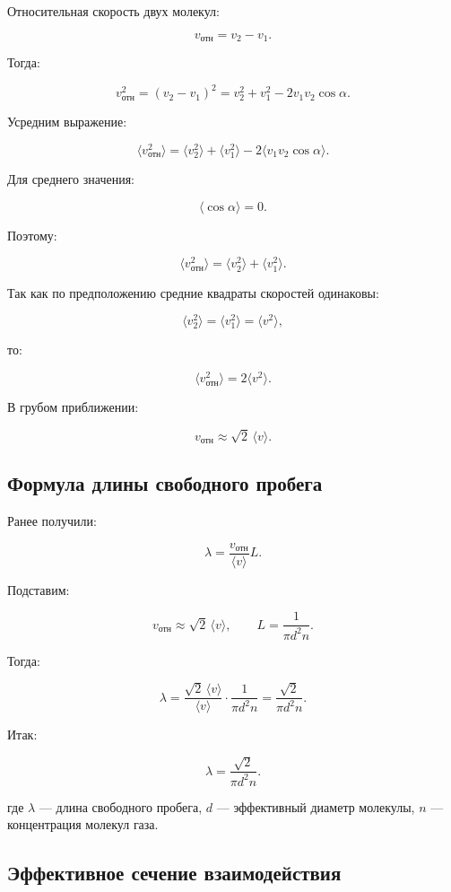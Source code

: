 \documentclass[a4paper,12pt]{article}
\begin{document}
Относительная скорость двух молекул:

\[
v_{\text{отн}}=v_2-v_1.
\]

Тогда:

\[
v_{\text{отн}}^2=(v_2-v_1)^2=v_2^2+v_1^2-2v_1v_2\cos\alpha.
\]

Усредним выражение:

\[
\langle v_{\text{отн}}^2 \rangle=\langle v_2^2 \rangle+\langle v_1^2 \rangle-2\langle v_1 v_2 \cos\alpha \rangle.
\]

Для среднего значения:

\[
\langle \cos\alpha \rangle=0.
\]

Поэтому:

\[
\langle v_{\text{отн}}^2 \rangle=\langle v_2^2 \rangle+\langle v_1^2 \rangle.
\]

Так как по предположению средние квадраты скоростей одинаковы:

\[
\langle v_2^2 \rangle=\langle v_1^2 \rangle=\langle v^2 \rangle,
\]

то:

\[
\langle v_{\text{отн}}^2 \rangle=2\langle v^2 \rangle.
\]

В грубом приближении:

\[
v_{\text{отн}}\approx \sqrt{2}\,\langle v \rangle.
\]

\subsection*{Формула длины свободного пробега}

Ранее получили:

\[
\lambda=\frac{v_{\text{отн}}}{\langle v \rangle}L.
\]

Подставим:

\[
v_{\text{отн}}\approx \sqrt{2}\,\langle v \rangle,
\qquad
L=\frac{1}{\pi d^2 n}.
\]

Тогда:

\[
\lambda=\frac{\sqrt{2}\,\langle v \rangle}{\langle v \rangle}\cdot \frac{1}{\pi d^2 n}
=
\frac{\sqrt{2}}{\pi d^2 n}.
\]

Итак:

\[
\lambda=\frac{\sqrt{2}}{\pi d^2 n}.
\]

где $\lambda$ — длина свободного пробега, $d$ — эффективный диаметр молекулы, $n$ — концентрация молекул газа.

\subsection*{Эффективное сечение взаимодействия}
\end{document}
